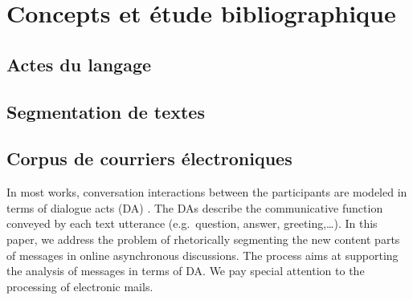 
\chapter{Concepts et étude bibliographique}

\label{ch:background_and_related_work}

\section{Actes du langage}


\section{Segmentation de textes}


\section{Corpus de courriers électroniques}


In most works, conversation interactions between the participants are modeled in terms of dialogue acts (DA) \cite{austin:1970}. The DAs describe the communicative function conveyed by each text utterance  (e.g.~question, answer, greeting,\ldots).
%
In this paper, we address the problem of rhetorically segmenting the new content parts of messages in online asynchronous discussions. 
The process aims at supporting the analysis of messages in terms of DA.
We pay special attention to the processing of electronic mails.

